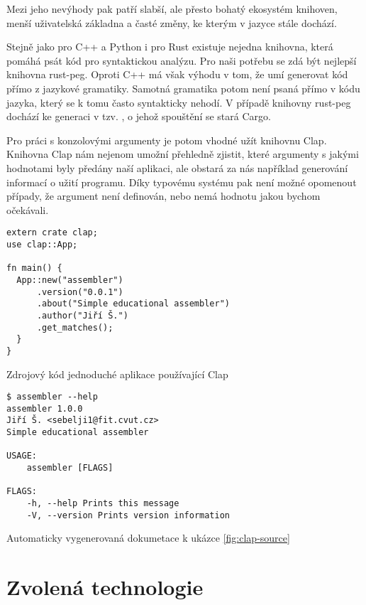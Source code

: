 Mezi jeho nevýhody pak patří slabší, ale přesto bohatý ekosystém knihoven, menší uživatelská základna\cite{so-survey-2018} a časté změny, ke kterým v jazyce stále dochází.

Stejně jako pro C++ a Python i pro Rust existuje nejedna knihovna, která pomáhá psát kód pro syntaktickou analýzu. Pro naši potřebu se zdá být nejlepší knihovna rust-peg\cite{github-rust-peg}. Oproti C++ má však výhodu v tom, že umí generovat kód přímo z jazykové gramatiky. Samotná gramatika potom není psaná přímo v kódu jazyka, který se k tomu často syntakticky nehodí. V případě knihovny rust-peg dochází ke generaci v tzv. , o jehož spouštění se stará Cargo.

Pro práci s konzolovými argumenty je potom vhodné užít knihovnu Clap\cite{github-clap}. Knihovna Clap nám nejenom umožní přehledně zjistit, které argumenty s jakými hodnotami byly předány naší aplikaci, ale obstará za nás například generování informací o užití programu. Díky typovému systému pak není možné opomenout případy, že argument není definován, nebo nemá hodnotu jakou bychom očekávali.

\begin{listing}
\begin{verbatim}
extern crate clap;
use clap::App;
 
fn main() {
  App::new("assembler")
      .version("0.0.1")
      .about("Simple educational assembler")
      .author("Jiří Š.")
      .get_matches();
  }
}
\end{verbatim}
\caption{Zdrojový kód jednoduché aplikace používající Clap}
\label{fig:clap-source}
\end{listing}

\begin{listing}
\begin{verbatim}
$ assembler --help
assembler 1.0.0
Jiří Š. <sebelji1@fit.cvut.cz>
Simple educational assembler

USAGE:
    assembler [FLAGS]

FLAGS:
    -h, --help Prints this message
    -V, --version Prints version information
\end{verbatim}
\caption{Automaticky vygenerovaná dokumetace k ukázce \ref{fig:clap-source}}
\label{fig:clap-output}
\end{listing}

\section{Zvolená technologie}


